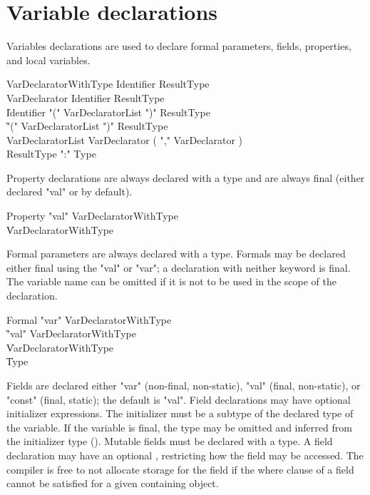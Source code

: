 \chapter{Variable declarations}
\label{exploded-syntax}

Variables declarations are used to declare formal parameters,
fields, properties, and local variables.

\begin{grammar}
VarDeclaratorWithType \: Identifier ResultType \\
VarDeclarator \: Identifier ResultType\opt \\
              \| Identifier \xcd"(" VarDeclaratorList \xcd")" ResultType\opt \\
              \| \xcd"(" VarDeclaratorList \xcd")" ResultType\opt \\
VarDeclaratorList \: VarDeclarator ( \xcd"," VarDeclarator )\star \\
ResultType \: \xcd":" Type \\
\end{grammar}

Property declarations are always declared with a type and are
always final (either declared \xcd"val" or by default).

\begin{grammar}
Property
        \: \xcd"val" VarDeclaratorWithType \\
        \| VarDeclaratorWithType \\
\end{grammar}

Formal parameters are always declared with a type.
Formals may be declared either
final using the \xcd"val" or \xcd"var"; a declaration with
neither keyword is final.
The
variable name can be omitted if it is not to be used in the
scope of the declaration.

\begin{grammar}
Formal
        \: \xcd"var" VarDeclaratorWithType \\
        \| \xcd"val" VarDeclaratorWithType \\
        \| VarDeclaratorWithType \\
        \| Type \\
\end{grammar}

Fields are declared either \xcd"var" (non-final, non-static),
\xcd"val" (final, non-static), or \xcd"const" (final, static);
the default is \xcd"val".
Field declarations may have optional
initializer expressions.  The initializer must be a subtype of
the declared type of the variable.  If the variable is final,
the type may be omitted and
inferred from the initializer type ().
Mutable fields must be declared with a type.
A field declaration may have an optional
, restricting how the field may be accessed.
The compiler is free to not allocate storage for the field if
the where clause of a field cannot be satisfied for a given containing
object.

